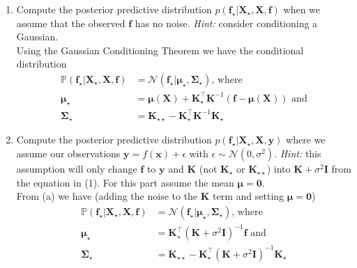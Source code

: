 \documentclass[letter, 12pt]{article}
\begin{document}
\begin{enumerate}
\begin{enumerate}
    \end{enumerate}
    \begin{enumerate}
        \item Compute the posterior predictive distribution
            $p(\mathbf{f}_\star|\mathbf{X}_\star,\mathbf{X},\mathbf{f})$ when
            we assume that the observed $\mathbf{f}$ has no noise. \textit{Hint:}
            consider conditioning a Gaussian.\\[1em]
            Using the Gaussian Conditioning Theorem we have the conditional distribution
            \begin{align*}
                \mathbb{P}(\mathbf{f}_\star | \mathbf{X}_\star, \mathbf{X}, \mathbf{f}) &= \mathcal{N}(\mathbf{f}_\star|\boldsymbol{\mu}_\star,\mathbf{\Sigma}_\star)\text{, where}\\
                \boldsymbol{\mu}_\star &= \boldsymbol{\mu}(\mathbf{X}) + \mathbf{K}_\star^\top\mathbf{K}^{-1}(\mathbf{f} - \boldsymbol{\mu}(\mathbf{X}))\text{ and}\\
                \mathbf{\Sigma}_\star &= \mathbf{K}_{\star\star} - \mathbf{K}_\star^\top \mathbf{K}^{-1}\mathbf{K}_\star
            \end{align*}
            \vfill
        \item Compute the posterior predictive distribution
            $p(\mathbf{f}_\star|\mathbf{X}_\star,\mathbf{X},\mathbf{y})$ where
            we assume our observations $\mathbf{y} = f(\mathbf{x}) + \epsilon$ with
            $\epsilon
            \sim \mathcal{N}(0,\sigma^2)$. \textit{Hint:} this assumption will only
            change $\mathbf{f}$ to $\mathbf{y}$ and $\mathbf{K}$ (not $\mathbf{K}_\star$
            or $\mathbf{K}_{\star\star}$) into $\mathbf{K} + \sigma^2\mathbf{I}$
            from the equation in (1). For this part assume the mean $\boldsymbol{\mu}=
            \mathbf{0}$.\\[1em]
            From (a) we have (adding the noise to the $\mathbf{K}$ term and setting $\boldsymbol{\mu}=\mathbf{0}$)
            \begin{align*}
                \mathbb{P}(\mathbf{f}_\star | \mathbf{X}_\star, \mathbf{X}, \mathbf{f}) &= \mathcal{N}(\mathbf{f}_\star|\boldsymbol{\mu}_\star,\mathbf{\Sigma}_\star)\text{, where}\\
                \boldsymbol{\mu}_\star &= \mathbf{K}_\star^\top\left(\mathbf{K} + \sigma^2 \mathbf{I}\right)^{-1}\mathbf{f}\text{ and}\\
                \mathbf{\Sigma}_\star &= \mathbf{K}_{\star\star} - \mathbf{K}_\star^\top \left(\mathbf{K}+\sigma^2\mathbf{I}\right)^{-1}\mathbf{K}_\star

\end{align*}
\end{enumerate}
\end{enumerate}
\end{document}

